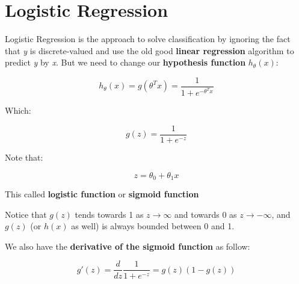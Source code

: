 \documentclass{article}
\begin{document}
\section{Logistic Regression}

\begin{flushleft}
Logistic Regression is the approach to solve classification by ignoring the fact that \textit{y} is discrete-valued and use the old good \textbf{linear regression} algorithm to predict \textit{y} by \textit{x}. But we need to change our \textbf{hypothesis function} $h_{\theta}(x)$:
\end{flushleft}

\begin{equation}
    h_{\theta}(x)=g(\theta^{T}x)=\frac{1}{1 + e^{-\theta^{T}x}}
\end{equation}

Which: 

\begin{equation}
    g(z)=\frac{1}{1 + e^{-z}}
\end{equation}

Note that:

\begin{equation}
    z = \theta_{0} + \theta_{1}x
\end{equation}

\begin{flushleft}
This called \textbf{logistic function} or \textbf{sigmoid function}
\end{flushleft}

\begin{center}
\end{center}

\begin{flushleft}
Notice that $g(z)$ tends towards 1 as $z\rightarrow\infty$ and towards 0 as $z\rightarrow-\infty$, and $g(z)$ (or $h(x)$ as well) is always bounded between 0 and 1.
\end{flushleft}

\begin{flushleft}
We also have the \textbf{derivative of the sigmoid function} as follow:
\end{flushleft}

\begin{equation}
    g'(z)=\frac{d}{dz}\frac{1}{1 + e^{-z}}=g(z)(1 - g(z))
\end{equation}
\end{document}
